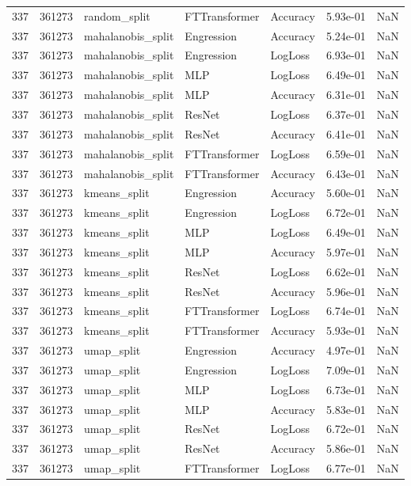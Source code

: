 \begin{tabular}{rrlllrr}
337 & 361273 & random\_split & FTTransformer & Accuracy & 5.93e-01 & NaN \\
337 & 361273 & mahalanobis\_split & Engression & Accuracy & 5.24e-01 & NaN \\
337 & 361273 & mahalanobis\_split & Engression & LogLoss & 6.93e-01 & NaN \\
337 & 361273 & mahalanobis\_split & MLP & LogLoss & 6.49e-01 & NaN \\
337 & 361273 & mahalanobis\_split & MLP & Accuracy & 6.31e-01 & NaN \\
337 & 361273 & mahalanobis\_split & ResNet & LogLoss & 6.37e-01 & NaN \\
337 & 361273 & mahalanobis\_split & ResNet & Accuracy & 6.41e-01 & NaN \\
337 & 361273 & mahalanobis\_split & FTTransformer & LogLoss & 6.59e-01 & NaN \\
337 & 361273 & mahalanobis\_split & FTTransformer & Accuracy & 6.43e-01 & NaN \\
337 & 361273 & kmeans\_split & Engression & Accuracy & 5.60e-01 & NaN \\
337 & 361273 & kmeans\_split & Engression & LogLoss & 6.72e-01 & NaN \\
337 & 361273 & kmeans\_split & MLP & LogLoss & 6.49e-01 & NaN \\
337 & 361273 & kmeans\_split & MLP & Accuracy & 5.97e-01 & NaN \\
337 & 361273 & kmeans\_split & ResNet & LogLoss & 6.62e-01 & NaN \\
337 & 361273 & kmeans\_split & ResNet & Accuracy & 5.96e-01 & NaN \\
337 & 361273 & kmeans\_split & FTTransformer & LogLoss & 6.74e-01 & NaN \\
337 & 361273 & kmeans\_split & FTTransformer & Accuracy & 5.93e-01 & NaN \\
337 & 361273 & umap\_split & Engression & Accuracy & 4.97e-01 & NaN \\
337 & 361273 & umap\_split & Engression & LogLoss & 7.09e-01 & NaN \\
337 & 361273 & umap\_split & MLP & LogLoss & 6.73e-01 & NaN \\
337 & 361273 & umap\_split & MLP & Accuracy & 5.83e-01 & NaN \\
337 & 361273 & umap\_split & ResNet & LogLoss & 6.72e-01 & NaN \\
337 & 361273 & umap\_split & ResNet & Accuracy & 5.86e-01 & NaN \\
337 & 361273 & umap\_split & FTTransformer & LogLoss & 6.77e-01 & NaN \\

\end{tabular}
